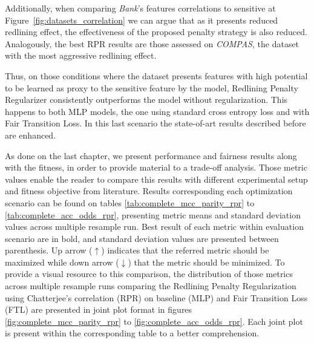 Additionally, when comparing \textit{Bank}'s features correlations to sensitive at Figure~\ref{fig:datasets_correlation} we can argue that as it presents reduced redlining effect, the effectiveness of the proposed penalty strategy is also reduced. Analogously, the best RPR results are those assessed on \textit{COMPAS}, the dataset with the most aggressive redlining effect.

Thus, on those conditions where the dataset presents features with high potential to be learned as proxy to the sensitive feature by the model, Redlining Penalty Regularizer consistently outperforms the model without regularization. This happens to both MLP models, the one using standard cross entropy loss and with Fair Transition Loss. In this last scenario the state-of-art results described before are enhanced.

As done on the last chapter, we present performance and fairness results along with the fitness, in order to provide material to a trade-off analysis. Those metric values enable the reader to compare this results with different experimental setup and fitness objective from literature. Results corresponding each optimization scenario can be found on tables \ref{tab:complete_mcc_parity_rpr} to \ref{tab:complete_acc_odds_rpr}, presenting metric means and standard deviation values across multiple resample run. Best result of each metric within evaluation scenario are in bold, and standard deviation values are presented between parenthesis. Up arrow ($\uparrow$) indicates that the referred metric should be maximized while down arrow ($\downarrow$) that the metric should be minimized. To provide a visual resource to this comparison, the distribution of those metrics across multiple resample runs comparing the Redlining Penalty Regularization using Chatterjee's correlation (RPR) on baseline (MLP) and Fair Transition Loss (FTL) are presented in joint plot format in figures \ref{fig:complete_mcc_parity_rpr} to \ref{fig:complete_acc_odds_rpr}. Each joint plot is present within the corresponding table to a better comprehension.

\newpage

